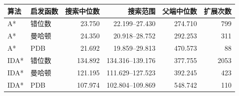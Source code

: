 \begin{tabular}{llrrrr}
\hline
\textbf{算法} & \textbf{启发函数} & \textbf{搜索中位数} & \textbf{搜索范围} & \textbf{父端中位数} & \textbf{扩展次数} \\
\hline
A* & 错位数 & 23.750 & 22.199--27.430 & 274.710 & 799 \\
A* & 曼哈顿 & 24.350 & 20.918--28.752 & 292.253 & 311 \\
A* & PDB & 21.692 & 19.859--29.813 & 470.573 & 88 \\
IDA* & 错位数 & 134.892 & 134.316--139.176 & 377.755 & 2053 \\
IDA* & 曼哈顿 & 121.195 & 111.629--127.523 & 392.245 & 423 \\
IDA* & PDB & 107.974 & 102.804--109.869 & 548.742 & 110 \\
\hline
\end{tabular}
